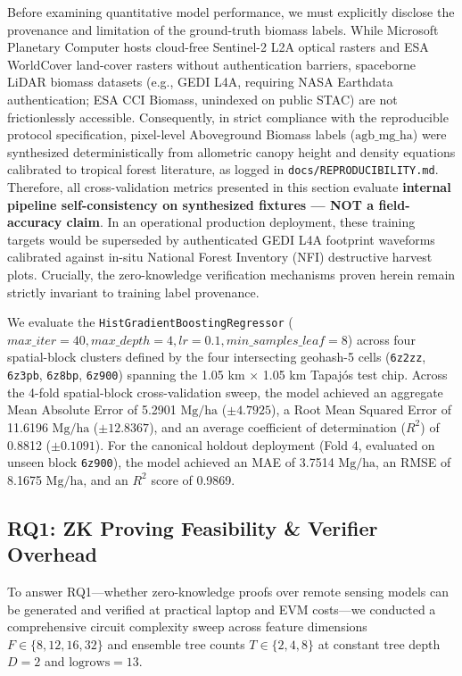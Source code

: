 \documentclass[preprint,12pt]{elsarticle}
\begin{document}
Before examining quantitative model performance, we must explicitly disclose the provenance and limitation of the ground-truth biomass labels. While Microsoft Planetary Computer hosts cloud-free Sentinel-2 L2A optical rasters and ESA WorldCover land-cover rasters without authentication barriers, spaceborne LiDAR biomass datasets (e.g., GEDI L4A, requiring NASA Earthdata authentication; ESA CCI Biomass, unindexed on public STAC) are not frictionlessly accessible. Consequently, in strict compliance with the reproducible protocol specification, pixel-level Aboveground Biomass labels ($\text{agb\_mg\_ha}$) were synthesized deterministically from allometric canopy height and density equations calibrated to tropical forest literature, as logged in \texttt{docs/REPRODUCIBILITY.md}. Therefore, all cross-validation metrics presented in this section evaluate \textbf{internal pipeline self-consistency on synthesized fixtures — NOT a field-accuracy claim}. In an operational production deployment, these training targets would be superseded by authenticated GEDI L4A footprint waveforms calibrated against in-situ National Forest Inventory (NFI) destructive harvest plots. Crucially, the zero-knowledge verification mechanisms proven herein remain strictly invariant to training label provenance.



We evaluate the \texttt{HistGradientBoostingRegressor} ($max\_iter = 40, max\_depth = 4, lr = 0.1, min\_samples\_leaf = 8$) across four spatial-block clusters defined by the four intersecting geohash-5 cells (\texttt{6z2zz}, \texttt{6z3pb}, \texttt{6z8bp}, \texttt{6z900}) spanning the 1.05 km $\times$ 1.05 km Tapajós test chip. Across the 4-fold spatial-block cross-validation sweep, the model achieved an aggregate Mean Absolute Error of 5.2901 $\text{Mg}/\text{ha}$ ($\pm 4.7925$), a Root Mean Squared Error of 11.6196 $\text{Mg}/\text{ha}$ ($\pm 12.8367$), and an average coefficient of determination ($R^2$) of 0.8812 ($\pm 0.1091$). For the canonical holdout deployment (Fold 4, evaluated on unseen block \texttt{6z900}), the model achieved an MAE of 3.7514 $\text{Mg}/\text{ha}$, an RMSE of 8.1675 $\text{Mg}/\text{ha}$, and an $R^2$ score of 0.9869.

\subsection{RQ1: ZK Proving Feasibility \& Verifier Overhead}

To answer RQ1—whether zero-knowledge proofs over remote sensing models can be generated and verified at practical laptop and EVM costs—we conducted a comprehensive circuit complexity sweep across feature dimensions $F \in \{8, 12, 16, 32\}$ and ensemble tree counts $T \in \{2, 4, 8\}$ at constant tree depth $D = 2$ and $\text{logrows} = 13$.
\end{document}
